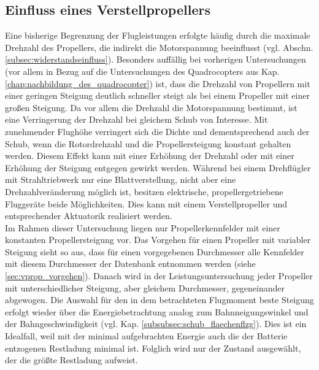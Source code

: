 \subsection{Einfluss eines Verstellpropellers}
\label{subsec:verstellprop}
Eine bisherige Begrenzung der Flugleistungen erfolgte häufig durch die maximale Drehzahl des Propellers, die indirekt die Motorspannung beeinflusst (vgl. Abschn. \ref{subsec:widerstandseinfluss}). 
Besonders auffällig bei vorherigen Untersuchungen (vor allem in Bezug auf die Untersuchungen des Quadrocopters aus Kap. \ref{chap:nachbildung_des_quadrocopter}) ist, dass die Drehzahl von Propellern mit einer geringen Steigung deutlich schneller steigt als bei einem Propeller mit einer großen Steigung. Da vor allem die Drehzahl die Motorspannung bestimmt, ist eine Verringerung der Drehzahl bei gleichem Schub von Interesse. Mit zunehmender Flughöhe verringert sich die Dichte und dementsprechend auch der Schub, wenn die Rotordrehzahl und die Propellersteigung konstant gehalten werden. Diesem Effekt kann mit einer Erhöhung der Drehzahl oder mit einer Erhöhung der Steigung entgegen gewirkt werden. Während bei einem Drehflügler mit Strahltriebwerk nur eine Blattverstellung, nicht aber eine Drehzahlveränderung möglich ist, besitzen elektrische, propellergetriebene Fluggeräte beide Möglichkeiten. Dies kann mit einem Verstellpropeller und entsprechender Aktuatorik realisiert werden. \\
Im Rahmen dieser Untersuchung liegen nur Propellerkennfelder mit einer konstanten Propellersteigung vor. Das Vorgehen für einen Propeller mit variabler Steigung sieht so aus, dass für einen vorgegebenen Durchmesser alle Kennfelder mit diesem Durchmesser der Datenbank entnommen werden (siehe \ref{sec:vprop_vorgehen}). Danach wird in der Leistungsuntersuchung jeder Propeller mit unterschiedlicher Steigung, aber gleichem Durchmesser, gegeneinander abgewogen. Die Auswahl für den in dem betrachteten Flugmoment beste Steigung erfolgt wieder über die Energiebetrachtung analog zum Bahnneigungswinkel und der Bahngeschwindigkeit (vgl. Kap. \ref{subsubsec:schub_flaechenflzg}). Dies ist ein Idealfall, weil mit der minimal aufgebrachten Energie auch die der Batterie entzogenen Restladung minimal ist. Folglich wird nur der Zustand ausgewählt, der die größte Restladung aufweist.

